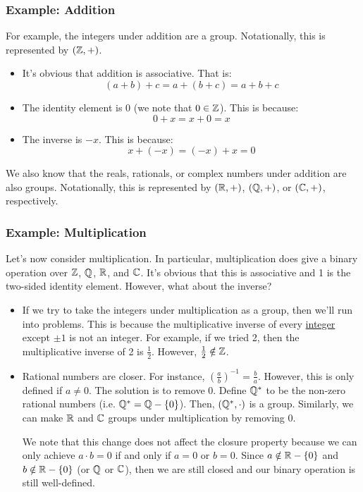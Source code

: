 \documentclass[letterpaper]{article}
\begin{document}
\subsubsection{Example: Addition}
For example, the integers under addition are a group. Notationally, this is represented by $(\mathbb{Z}, +)$. 
\begin{itemize}
    \item It's obvious that addition is associative. That is:
    \[(a + b) + c = a + (b + c) = a + b + c\]

    \item The identity element is 0 (we note that $0 \in \mathbb{Z}$). This is because:
    \[0 + x = x + 0 = x\]

    \item The inverse is $-x$. This is because:
    \[x + (-x) = (-x) + x = 0\]
\end{itemize}
We also know that the reals, rationals, or complex numbers under addition are also groups. Notationally, this is represented by $(\mathbb{R}, +)$, $(\mathbb{Q}, +)$, or $(\mathbb{C}, +)$, respectively. 

\subsubsection{Example: Multiplication}
Let's now consider multiplication. In particular, multiplication does give a binary operation over $\mathbb{Z}$, $\mathbb{Q}$, $\mathbb{R}$, and $\mathbb{C}$. It's obvious that this is associative and 1 is the two-sided identity element. However, what about the inverse? 
\begin{itemize}
    \item If we try to take the integers under multiplication as a group, then we'll run into problems. This is because the multiplicative inverse of every \underline{integer} except $\pm 1$ is not an integer. For example, if we tried 2, then the multiplicative inverse of 2 is $\frac{1}{2}$. However, $\frac{1}{2} \notin \mathbb{Z}$. 
    
    \item Rational numbers are closer. For instance, $\left(\frac{a}{b}\right)^{-1} = \frac{b}{a}$. However, this is only defined if $a \neq 0$. The solution is to remove 0. Define $\mathbb{Q}^*$ to be the non-zero rational numbers (i.e. $\mathbb{Q}^* = \mathbb{Q} - \{0\}$). Then, $(\mathbb{Q}^*, \cdot)$ is a group. Similarly, we can make $\mathbb{R}$ and $\mathbb{C}$ groups under multiplication by removing 0. 
    
    \bigskip 

    We note that this change does not affect the closure property because we can only achieve $a \cdot b = 0$ if and only if $a = 0$ or $b = 0$. Since $a \notin \mathbb{R} - \{0\}$ and $b \notin \mathbb{R} - \{0\}$ (or $\mathbb{Q}$ or $\mathbb{C}$), then we are still closed and our binary operation is still well-defined. 
\end{itemize}
\end{document}
